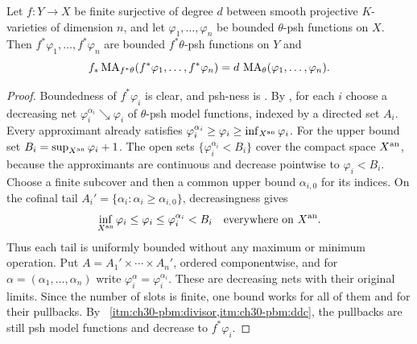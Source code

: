 \begin{theorem}
\label{thm:ch30-finite-bounded-projection}
Let \(f:Y\to X\) be finite surjective of degree \(d\) between smooth
projective \(K\)-varieties of dimension \(n\), and let
\(\varphi_1,\ldots,\varphi_n\) be bounded \(\theta\)-psh functions on
\(X\).  Then \(f^*\varphi_1,\ldots,f^*\varphi_n\) are bounded
\(f^*\theta\)-psh functions on \(Y\) and
\begin{equation}
\label{eq:ch30-bounded-projection}
 f_*\operatorname{MA}_{f^*\theta}(f^*\varphi_1,\ldots,f^*\varphi_n)
 =d\,\operatorname{MA}_\theta(\varphi_1,\ldots,\varphi_n).
\end{equation}
\end{theorem}

\begin{proof}
Boundedness of \(f^*\varphi_i\) is clear, and psh-ness is
.  By
, for each \(i\) choose a
decreasing net \(\varphi_i^{\alpha_i}\searrow\varphi_i\) of
\(\theta\)-psh model functions, indexed by a directed set \(A_i\).
Every approximant already satisfies
\(\varphi_i^{\alpha_i}\geq\varphi_i\geq\inf_{X^{\mathrm{an}}}\varphi_i\).
For the upper bound set \(B_i=\sup_{X^{\mathrm{an}}}\varphi_i+1\).
The open sets \(\{\varphi_i^{\alpha_i}<B_i\}\) cover the compact space
\(X^{\mathrm{an}}\), because the approximants are continuous and decrease
pointwise to \(\varphi_i<B_i\).  Choose a finite subcover and then a
common upper bound \(\alpha_{i,0}\) for its indices.  On the cofinal tail
\(A_i'=\{\alpha_i:\alpha_i\geq\alpha_{i,0}\}\), decreasingness gives
\[
 \inf_{X^{\mathrm{an}}}\varphi_i\leq\varphi_i\leq
 \varphi_i^{\alpha_i}<B_i
 \quad\text{everywhere on }X^{\mathrm{an}}.
\]
Thus each tail is uniformly bounded without any maximum or minimum
operation.  Put \(A=A_1'\times\cdots\times A_n'\), ordered
componentwise, and for \(\alpha=(\alpha_1,\ldots,\alpha_n)\) write
\(\varphi_i^\alpha=\varphi_i^{\alpha_i}\).
These are decreasing nets with their original limits.  Since the number
of slots is finite, one bound works for all of them and for their
pullbacks.  By \,
\cref{itm:ch30-pbm:divisor,itm:ch30-pbm:ddc}, the pullbacks are still
psh model functions and decrease to \(f^*\varphi_i\).


\end{proof}
